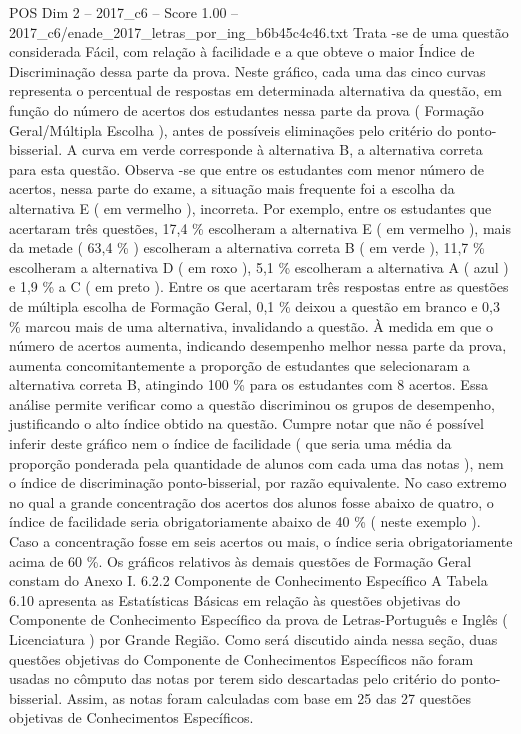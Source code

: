 \begin{textsample}{POS Dim 2 – 2017\_c6 – Score 1.00 – 2017\_c6/enade\_2017\_letras\_por\_ing\_b6b45c4c46.txt}
Trata -se de uma questão considerada Fácil, com relação à facilidade e a que obteve o maior Índice de Discriminação dessa parte da prova.
Neste gráfico, cada uma das cinco curvas representa o percentual de respostas em determinada alternativa da questão, em função do número de acertos dos estudantes nessa parte da prova ( Formação Geral/Múltipla Escolha ), antes de possíveis eliminações pelo critério do ponto-bisserial.
A curva em verde corresponde à alternativa B, a alternativa correta para esta questão.
Observa -se que entre os estudantes com menor número de acertos, nessa parte do exame, a situação mais frequente foi a escolha da alternativa E ( em vermelho ), incorreta.
Por exemplo, entre os estudantes que acertaram três questões, 17,4 \% escolheram a alternativa E ( em vermelho ), mais da metade ( 63,4 \% ) escolheram a alternativa correta B ( em verde ), 11,7 \% escolheram a alternativa D ( em roxo ), 5,1 \% escolheram a alternativa A ( azul ) e 1,9 \% a C ( em preto ).
Entre os que acertaram três respostas entre as questões de múltipla escolha de Formação Geral, 0,1 \% deixou a questão em branco e 0,3 \% marcou mais de uma alternativa, invalidando a questão.
À medida em que o número de acertos aumenta, indicando desempenho melhor nessa parte da prova, aumenta concomitantemente a proporção de estudantes que selecionaram a alternativa correta B, atingindo 100 \% para os estudantes com 8 acertos.
Essa análise permite verificar como a questão discriminou os grupos de desempenho, justificando o alto índice obtido na questão.
Cumpre notar que não é possível inferir deste gráfico nem o índice de facilidade ( que seria uma média da proporção ponderada pela quantidade de alunos com cada uma das notas ), nem o índice de discriminação ponto-bisserial, por razão equivalente.
No caso extremo no qual a grande concentração dos acertos dos alunos fosse abaixo de quatro, o índice de facilidade seria obrigatoriamente abaixo de 40 \% ( neste exemplo ).
Caso a concentração fosse em seis acertos ou mais, o índice seria obrigatoriamente acima de 60 \%.
Os gráficos relativos às demais questões de Formação Geral constam do Anexo I. 6.2.2 Componente de Conhecimento Específico A Tabela 6.10 apresenta as Estatísticas Básicas em relação às questões objetivas do Componente de Conhecimento Específico da prova de Letras-Português e Inglês ( Licenciatura ) por Grande Região.
Como será discutido ainda nessa seção, duas questões objetivas do Componente de Conhecimentos Específicos não foram usadas no cômputo das notas por terem sido descartadas pelo critério do ponto-bisserial.
Assim, as notas foram calculadas com base em 25 das 27 questões objetivas de Conhecimentos Específicos.

\end{textsample}
